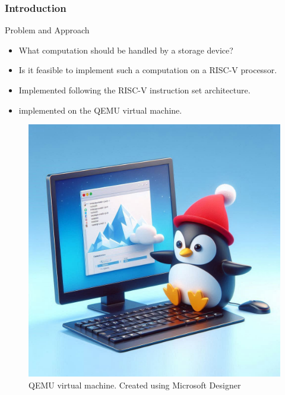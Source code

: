 \begin{frame}[hoved]
	\frametitle{Introduction}
	\begin{minipage}[t]{0.45\textwidth}
		{\large Problem and Approach}
		\begin{itemize}
			\item What computation should be handled by a storage device?
			\item Is it feasible to implement such a computation on a RISC-V
			      processor.
			\item Implemented following the RISC-V instruction set architecture.
			\item implemented on the QEMU virtual machine.
		\end{itemize}
	\end{minipage}
	\hfill
	\begin{minipage}[t]{0.45\textwidth}
		\begin{figure}
			\begin{center}
				\includegraphics[height=0.55\textheight]{figures/qemuvirt.jpeg}
			\end{center}
			\caption{QEMU virtual machine. {\tiny Created using Microsoft
						Designer}}\label{fig:qemu}
		\end{figure}
	\end{minipage}
\end{frame}

